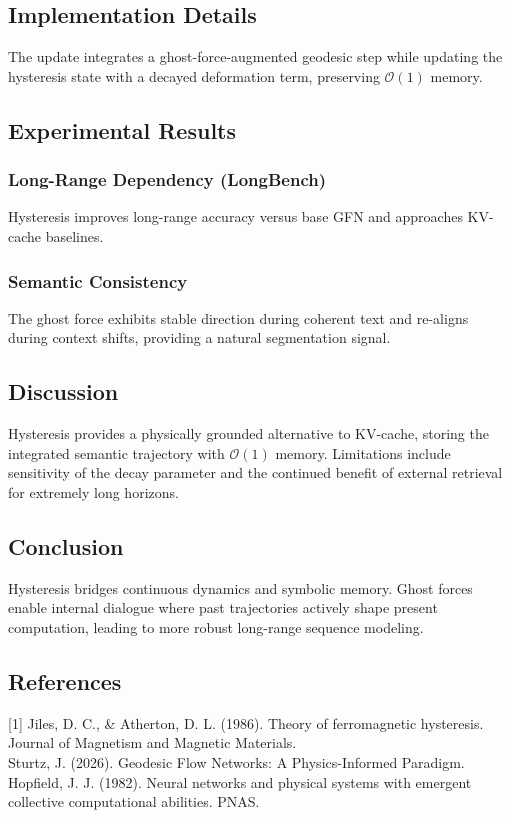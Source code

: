 \documentclass{article}
\numberwithin{equation}{section}
\begin{document}
\subsection{Implementation Details}
The update integrates a ghost-force-augmented geodesic step while updating the hysteresis state with a decayed deformation term, preserving $\mathcal{O}(1)$ memory.

\subsection{Experimental Results}
\subsubsection{Long-Range Dependency (LongBench)}
Hysteresis improves long-range accuracy versus base GFN and approaches KV-cache baselines.

\subsubsection{Semantic Consistency}
The ghost force exhibits stable direction during coherent text and re-aligns during context shifts, providing a natural segmentation signal.

\subsection{Discussion}
Hysteresis provides a physically grounded alternative to KV-cache, storing the integrated semantic trajectory with $\mathcal{O}(1)$ memory. Limitations include sensitivity of the decay parameter and the continued benefit of external retrieval for extremely long horizons.

\subsection{Conclusion}
Hysteresis bridges continuous dynamics and symbolic memory. Ghost forces enable internal dialogue where past trajectories actively shape present computation, leading to more robust long-range sequence modeling.

\subsection*{References}
[1] Jiles, D. C., \& Atherton, D. L. (1986). Theory of ferromagnetic hysteresis. Journal of Magnetism and Magnetic Materials.\\
[2] Sturtz, J. (2026). Geodesic Flow Networks: A Physics-Informed Paradigm.\\
[3] Hopfield, J. J. (1982). Neural networks and physical systems with emergent collective computational abilities. PNAS.
\end{document}
